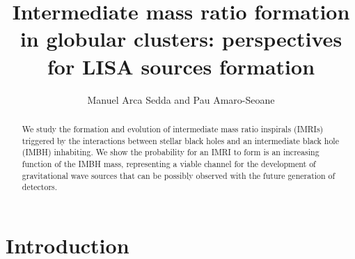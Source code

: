 \documentclass[twocolumn]{aastex62}
\begin{document}
\title{Intermediate mass ratio formation in globular clusters: perspectives for LISA sources formation}


\author{Manuel Arca Sedda and Pau Amaro-Seoane}

\begin{abstract}
We study the formation and evolution of intermediate mass ratio inspirals (IMRIs) triggered by the interactions between stellar black holes and an intermediate black hole (IMBH) inhabiting. We show the probability for an IMRI to form is an increasing function of the IMBH mass, representing a viable channel for the development of gravitational wave sources that can be possibly observed with the future generation of detectors.
\end{abstract}



\section{Introduction}
\end{document}
